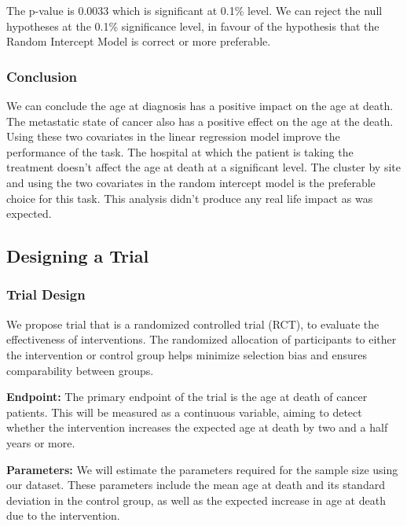 \documentclass[
]{article}
\begin{document}
The p-value is 0.0033 which is significant at 0.1\% level. We can reject
the null hypotheses at the 0.1\% significance level, in favour of the
hypothesis that the Random Intercept Model is correct or more
preferable.

\hypertarget{conclusion}{%
\subsubsection{Conclusion}\label{conclusion}}

We can conclude the age at diagnosis has a positive impact on the age at
death. The metastatic state of cancer also has a positive effect on the
age at the death. Using these two covariates in the linear regression
model improve the performance of the task. The hospital at which the
patient is taking the treatment doesn't affect the age at death at a
significant level. The cluster by site and using the two covariates in
the random intercept model is the preferable choice for this task. This
analysis didn't produce any real life impact as was expected.

\hypertarget{designing-a-trial}{%
\subsection{Designing a Trial}\label{designing-a-trial}}

\hypertarget{trial-design}{%
\subsubsection{Trial Design}\label{trial-design}}

We propose trial that is a randomized controlled trial (RCT), to
evaluate the effectiveness of interventions. The randomized allocation
of participants to either the intervention or control group helps
minimize selection bias and ensures comparability between groups.

\textbf{Endpoint:} The primary endpoint of the trial is the age at death
of cancer patients. This will be measured as a continuous variable,
aiming to detect whether the intervention increases the expected age at
death by two and a half years or more.

\textbf{Parameters:} We will estimate the parameters required for the
sample size using our dataset. These parameters include the mean age at
death and its standard deviation in the control group, as well as the
expected increase in age at death due to the intervention.
\end{document}
